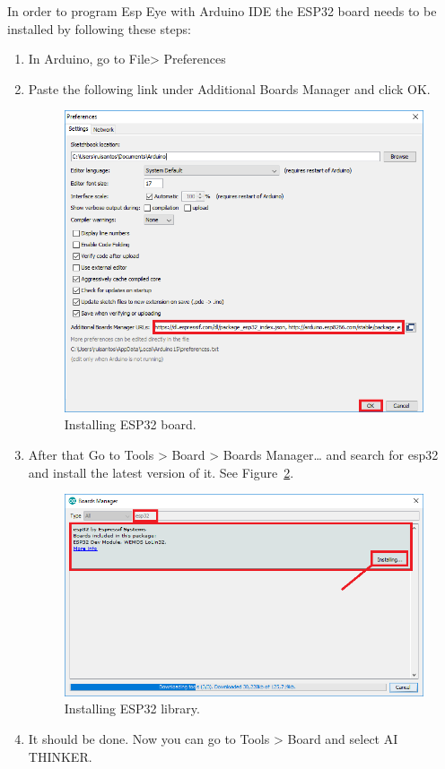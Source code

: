 In order to program Esp Eye with Arduino IDE the ESP32 board needs to be installed by following these steps: 
\begin{enumerate}
    \item In Arduino, go to File> Preferences
    \item Paste the following link  under Additional Boards Manager and click OK.
    
    
    \begin{figure}[!htb]
    \centering
    \includegraphics[width=1\textwidth]{figures/ArduinoIDE.png}
    \caption{Installing ESP32 board.}
    \label{fig:eessdff}
\end{figure}
    \item After that Go to Tools > Board > Boards Manager… and search for esp32 and install the latest version of it. See Figure~\ref{fig:eessdff}. 
    
      \begin{figure}[!htb]
    \centering
    \includegraphics[width=1\textwidth]{figures/Arduinoboard.png}
    \caption{Installing ESP32 library.}
    \label{fig:eessdff}
\end{figure}
    \item It should be done. Now you can go to Tools > Board and select AI THINKER. 

 
\end{enumerate}


